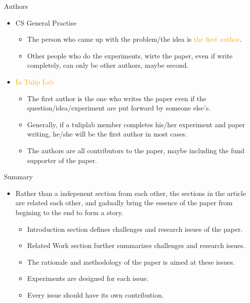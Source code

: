 \documentclass[
 size=14pt,
 paper=smartboard,  %
 mode=present, 		%
 display=slides, 	%
 style=tuliplab,  	%
 pauseslide,
 fleqn,leqno]{powerdot}{}
\begin{document}

\begin{slide}[toc=,bm=]{Authors}
	\begin{itemize}
		\item CS General Practise
			\begin{itemize}
				\item The person who came up with the problem/the idea is \textcolor{orange}{the first author}. 
				\item Other people who do the experiments, wirte the paper, even if write completely, can only be other authors, maybe second.
			\end{itemize}
		\item \textcolor{orange}{In Tulip Lab}
			\begin{itemize}
				\item The first author is the one who writes the paper even if the question/idea/experiment are put forward by someone else's.
				\item Generally, if a tuliplab member completes his/her experiment and paper writing, he/she will be the first author in most cases.
				\item The authors are all contributors to the paper, maybe including the fund supporter of the paper.
			\end{itemize}
	\end{itemize}
\end{slide}



\begin{slide}[toc=,bm=]{Summary}
	\begin{itemize}
		\item Rather than a indepenent section from each other, the sections in the article are related each other, and gadually bring the essence of the paper from begining to the end to form a story.
			\begin{itemize}
				\item Introduction section defines challenges and research issues of the paper.
				\item Related Work section further summarizes challenges and research issues.
				\item The rationale and methodology of the paper is aimed at these issues.
				\item Experiments are designed for each issue.
				\item Every issue should have its own contribution.		
			\end{itemize}
	\end{itemize}
\end{slide}
\end{document}
